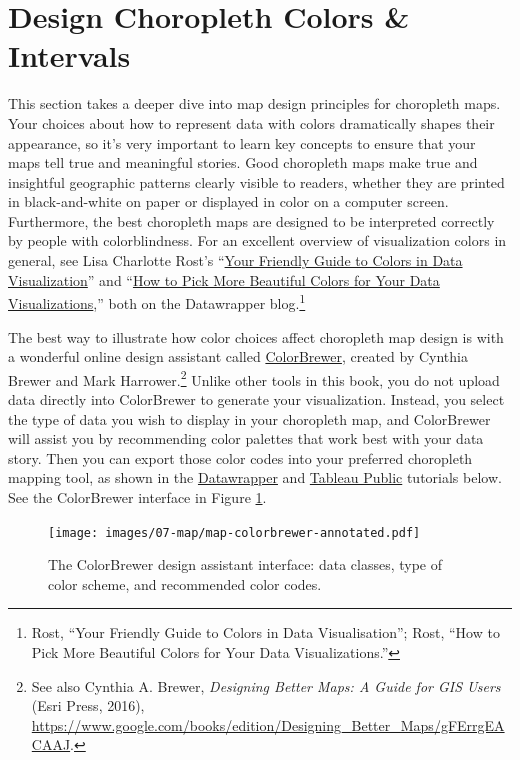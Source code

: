 \documentclass[
  english,
]{book}
\begin{document}
\hypertarget{design-choropleth}{%
\section*{Design Choropleth Colors \& Intervals}\label{design-choropleth}}

This section takes a deeper dive into map design principles for choropleth maps. Your choices about how to represent data with colors dramatically shapes their appearance, so it's very important to learn key concepts to ensure that your maps tell true and meaningful stories. Good choropleth maps make true and insightful geographic patterns clearly visible to readers, whether they are printed in black-and-white on paper or displayed in color on a computer screen. Furthermore, the best choropleth maps are designed to be interpreted correctly by people with colorblindness. For an excellent overview of visualization colors in general, see Lisa Charlotte Rost's ``\href{https://blog.datawrapper.de/colorguide/}{Your Friendly Guide to Colors in Data Visualization}'' and ``\href{https://blog.datawrapper.de/beautifulcolors/index.html}{How to Pick More Beautiful Colors for Your Data Visualizations},'' both on the Datawrapper blog.\footnote{Rost, {``Your {Friendly Guide} to {Colors} in {Data Visualisation}''}; Rost, {``How to {Pick More Beautiful Colors} for {Your Data Visualizations}.''}}

The best way to illustrate how color choices affect choropleth map design is with a wonderful online design assistant called \href{https://colorbrewer2.org/}{ColorBrewer}, created by Cynthia Brewer and Mark Harrower.\footnote{See also Cynthia A. Brewer, \emph{Designing {Better Maps}: {A Guide} for {GIS Users}} ({Esri Press}, 2016), \url{https://www.google.com/books/edition/Designing_Better_Maps/gFErrgEACAAJ}.} Unlike other tools in this book, you do not upload data directly into ColorBrewer to generate your visualization. Instead, you select the type of data you wish to display in your choropleth map, and ColorBrewer will assist you by recommending color palettes that work best with your data story. Then you can export those color codes into your preferred choropleth mapping tool, as shown in the \href{choropleth-datawrapper.html}{Datawrapper} and \href{map-tableau.html}{Tableau Public} tutorials below. See the ColorBrewer interface in Figure \ref{fig:map-colorbrewer}.



\begin{figure}
\centering
\texttt{[image: images/07-map/map-colorbrewer-annotated.pdf]}
\caption{\label{fig:map-colorbrewer}The ColorBrewer design assistant interface: data classes, type of color scheme, and recommended color codes.}
\end{figure}
\end{document}
